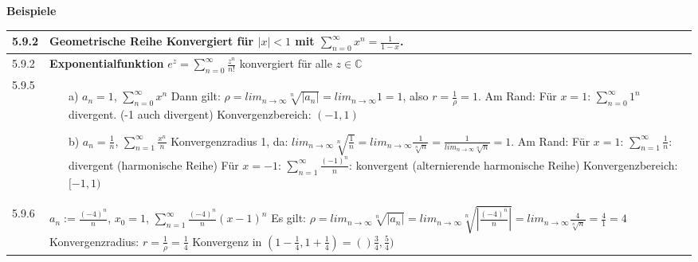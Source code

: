     \noindent
    \textbf{Beispiele}
    \begin{table}[H]
    \begin{tabularx}{\textwidth}{X m{16cm}}
        \toprule

        5.9.2 & \textbf{Geometrische Reihe} \hfill \break 
                Konvergiert für $|x| < 1$ mit $\sum^{\infty}_{n=0} x^n = \frac{1}{1-x}$. \\
        \midrule
        5.9.2 & \textbf{Exponentialfunktion} \hfill \break
                $e^z = \sum^{\infty}_{n=0} \frac{z^n}{n!}$ konvergiert für alle $z \in \mathbb{C}$ \\ 
        \midrule
        5.9.5 & \begin{itemize}
                    \item[a)] $a_n = 1$, $\sum^{\infty}_{n=0} x^n$ \hfill \break
                                Dann gilt: $\rho = lim_{n \rightarrow \infty} \sqrt[n]{|a_n|} = lim_{n \rightarrow \infty} 1 = 1$, also $r = \frac{1}{\rho} = 1$. \hfill \break
                                Am Rand: Für $x=1$: $\sum^{\infty}_{n=0} 1^n$ divergent. (-1 auch divergent) \hfill \break
                                Konvergenzbereich: $(-1,1)$
                    \item[b)] $a_n = \frac{1}{n}$, $\sum^{\infty}_{n=1} \frac{x^n}{n}$ \hfill \break
                                Konvergenzradius 1, da: $lim_{n \rightarrow \infty} \sqrt[n]{\frac{1}{n}} = lim_{n \rightarrow \infty} \frac{1}{\sqrt[n]{n}}
                                = \frac{1}{lim_{n \rightarrow \infty} \sqrt[n]{n}} = 1$. \hfill \break
                                Am Rand: Für $x=1$: $\sum^{\infty}_{n=1} \frac{1}{n}$: divergent (harmonische Reihe) \hfill \break
                                Für $x=-1$: $\sum^{\infty}_{n=1} \frac{(-1)^n}{n}$: konvergent (alternierende harmonische Reihe) \hfill \break
                                Konvergenzbereich: $[-1,1)$
                \end{itemize} \\
        \midrule
        5.9.6 & $a_n := \frac{(-4)^n}{n}$, $x_0 = 1$, $\sum^{\infty}_{n=1} \frac{(-4)^n}{n}(x-1)^n$ \hfill \break
                Es gilt: $\rho = lim_{n \rightarrow \infty} \sqrt[n]{|a_n|} = lim_{n \rightarrow \infty} \sqrt[n]{|\frac{(-4)^n}{n}|} =
                lim_{n \rightarrow \infty} \frac{4}{\sqrt[n]{n}} = \frac{4}{1} = 4$ \hfill \break 
                Konvergenzradius: $r = \frac{1}{\rho} = \frac{1}{4}$ \hfill \break
                Konvergenz in $(1- \frac{1}{4}, 1 + \frac{1}{4}) = ()\frac{3}{4}, \frac{5}{4})$ \hfill \break

\end{tabularx}
\end{table}
